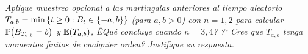 \emph{
    Aplique muestreo opcional a las martingalas anteriores al tiempo 
    aleatorio $T_{a,b}=\min\left\{ t\geq 0:B_t\in\left\{ -a,b\right\} \right\} $ (para $a,b>0$) 
    con $n=1,2$ para calcular $\mathbb{P}\! \left( B_{T_{a,b}}=b \right)$ y $\mathbb{E}\! \left( T_{a,b} \right)$,
    ËQu\'e concluye cuando $n=3,4$? ?` Cree que $T_{a,b}$ tenga momentos 
    finitos de cualquier orden? Justifique su respuesta.\pn
}

\afterstatement\pn